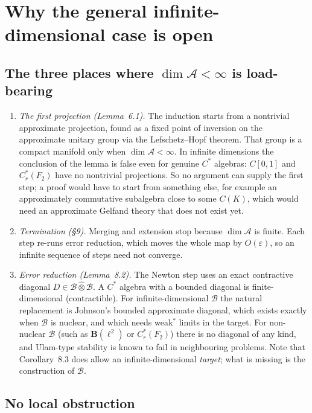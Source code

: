 \documentclass[11pt]{article}
\theoremstyle{remark}
\newcommand{\eps}{\varepsilon}
\newcommand{\cA}{\mathcal{A}}
\newcommand{\cB}{\mathcal{B}}
\newcommand{\Bo}{\mathbf{B}}
\begin{document}
\section{Why the general infinite-dimensional case is open}\label{sec:open}

\subsection{The three places where $\dim\cA<\infty$ is load-bearing}

\begin{enumerate}
\item \emph{The first projection (Lemma~6.1).} The induction starts from a nontrivial approximate projection, found as a fixed point of inversion on the approximate unitary group via the Lefschetz--Hopf theorem. That group is a compact manifold only when $\dim\cA<\infty$. In infinite dimensions the conclusion of the lemma is false even for genuine $C^*$ algebras: $C[0,1]$ and $C^*_r(F_2)$ have no nontrivial projections. So no argument can supply the first step; a proof would have to start from something else, for example an approximately commutative subalgebra close to some $C(K)$, which would need an approximate Gelfand theory that does not exist yet.
\item \emph{Termination (\S9).} Merging and extension stop because $\dim\cA$ is finite. Each step re-runs error reduction, which moves the whole map by $O(\eps)$, so an infinite sequence of steps need not converge.
\item \emph{Error reduction (Lemma~8.2).} The Newton step uses an exact contractive diagonal $D\in\cB\hat\otimes\cB$. A $C^*$ algebra with a bounded diagonal is finite-dimensional (contractible). For infinite-dimensional $\cB$ the natural replacement is Johnson's bounded approximate diagonal, which exists exactly when $\cB$ is nuclear, and which needs weak$^*$ limits in the target. For non-nuclear $\cB$ (such as $\Bo(\ell^2)$ or $C^*_r(F_2)$) there is no diagonal of any kind, and Ulam-type stability is known to fail in neighbouring problems. Note that Corollary~8.3 does allow an infinite-dimensional \emph{target}; what is missing is the construction of $\cB$.
\end{enumerate}

\subsection{No local obstruction}
\end{document}
